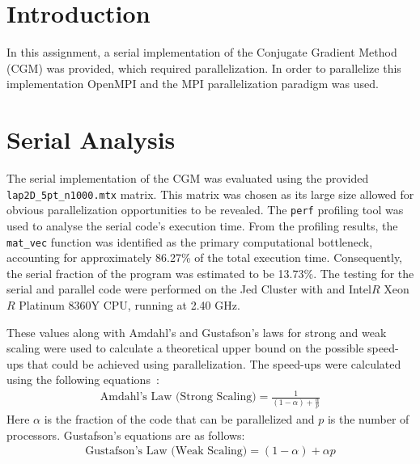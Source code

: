 \section{Introduction}
In this assignment, a serial implementation of the Conjugate Gradient Method (CGM) was provided, which required
parallelization. In order to parallelize this implementation OpenMPI and the MPI parallelization paradigm was used.

\section{Serial Analysis}
The serial implementation of the CGM was evaluated using the provided \lstinline[language=Julia]|lap2D_5pt_n1000.mtx| matrix. This matrix
was chosen as its large size allowed for obvious parallelization opportunities to be revealed. The \lstinline[language=Julia]|perf|
profiling tool was used to analyse the serial code's execution time. From the profiling results, the \lstinline[language=Julia]|mat_vec|
function was identified as the primary computational bottleneck, accounting for approximately 86.27\% of the total execution
time. Consequently, the serial fraction of the program was estimated to be 13.73\%. The testing for the serial and
parallel code were performed on the Jed Cluster with and Intel\(R\) Xeon\(R\) Platinum 8360Y CPU, running at  2.40 GHz.


These values along with Amdahl's and Gustafson's laws for strong and weak scaling were used to calculate a theoretical
upper bound on the possible speed-ups that could be achieved using parallelization. The speed-ups were calculated using
the following equations~\cite{AmdahlGustafson2023}: 
\begin{align*}
   \text{Amdahl's Law (Strong Scaling)} = \frac{1}{(1-\alpha) + \frac{\alpha}{p}} 
\end{align*}
Here $\alpha$ is the fraction of the code that can be parallelized and $p$ is the number of processors. Gustafson's
equations are as follows:
\begin{align*}
    \text{Gustafson's Law (Weak Scaling)} = (1-\alpha) + \alpha p 
\end{align*}

